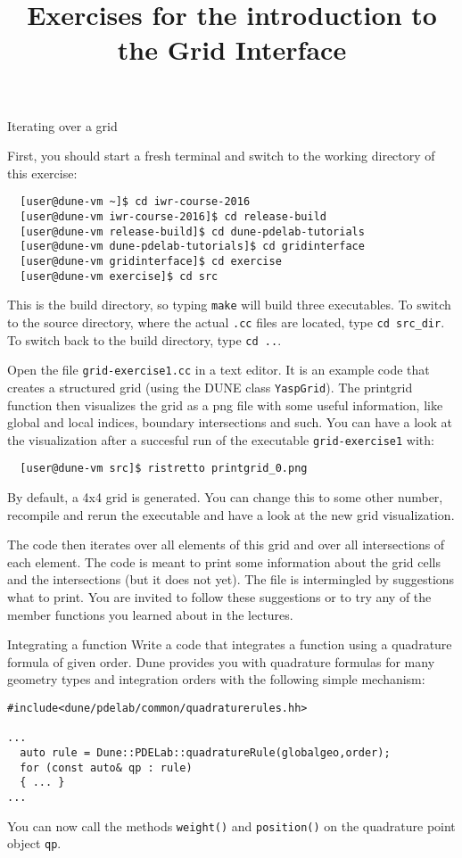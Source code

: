 \documentclass[12pt,a4paper]{article}
\title{\textbf{Exercises for the introduction to the Grid Interface}}
\begin{document}
\exerciseheader

\begin{Exercise}{Iterating over a grid}

First, you should start a fresh terminal and switch to the working directory of this exercise:
\begin{lstlisting}
  [user@dune-vm ~]$ cd iwr-course-2016
  [user@dune-vm iwr-course-2016]$ cd release-build
  [user@dune-vm release-build]$ cd dune-pdelab-tutorials
  [user@dune-vm dune-pdelab-tutorials]$ cd gridinterface
  [user@dune-vm gridinterface]$ cd exercise
  [user@dune-vm exercise]$ cd src
\end{lstlisting}

This is the build directory, so typing \lstinline!make! will build three executables.
To switch to the source directory, where the actual \lstinline!.cc! files are located, type \lstinline!cd src_dir!.
To switch back to the build directory, type \lstinline!cd ..!.

Open the file \texttt{grid-exercise1.cc} in a text editor.  It is an
example code that creates a structured grid (using the DUNE class
\texttt{YaspGrid}). The printgrid function then visualizes the grid
as a png file with some useful information, like global and local
indices, boundary intersections and such. You can have a look at the
visualization after a succesful run of the executable \lstinline!grid-exercise1!
with:

\begin{lstlisting}
  [user@dune-vm src]$ ristretto printgrid_0.png
\end{lstlisting}

By default, a 4x4 grid is generated. You can change this to some
other number, recompile and rerun the executable and have a look at
the new grid visualization.

The code then iterates over all elements of this grid and
over all intersections of each element.  The code is meant to print
some information about the grid cells and the intersections (but it
does not yet).  The file is intermingled by suggestions what to print.
You are invited to follow these suggestions or to try any of the
member functions you learned about in the lectures.
\end{Exercise}

\begin{Exercise}{Integrating a function}
 Write a code that integrates a function using a quadrature formula of given order.
 Dune provides you with quadrature formulas for many geometry types and integration orders
 with the following simple mechanism:

\begin{lstlisting}
#include<dune/pdelab/common/quadraturerules.hh>

...
  auto rule = Dune::PDELab::quadratureRule(globalgeo,order);
  for (const auto& qp : rule)
  { ... }
...
\end{lstlisting}
 You can now call the methods \verb!weight()! and \verb!position()! on the quadrature
 point object \verb!qp!.
\end{Exercise}
\end{document}
